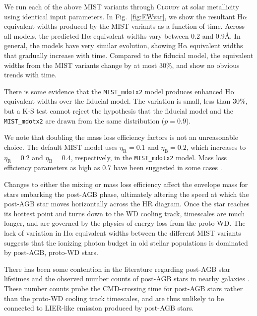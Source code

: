 \documentclass[preprint2]{aastex62}
\newcommand{\Cloudy}{\textsc{Cloudy}\xspace}
\newcommand{\ha}{\ensuremath{\mathrm{H\alpha}}\xspace}
\newcommand{\ang}{\ensuremath{\mbox{\AA}}\xspace}
\begin{document}
We run each of the above MIST variants through \Cloudy at solar metallicity using identical input parameters. In Fig.~\ref{fig:EWvar}, we show the resultant \ha equivalent widths produced by the MIST variants as a function of time. Across all models, the predicted \ha equivalent widths vary between 0.2 and 0.9\ang. In general, the models have very similar evolution, showing \ha equivalent widths that gradually increase with time. Compared to the fiducial model, the equivalent widths from the MIST variants change by at most 30\%, and show no obvious trends with time.

There is some evidence that the {\tt MIST\_mdotx2} model produces enhanced \ha equivalent widths over the fiducial model. The variation is small, less than 30\%, but a K-S test cannot reject the hypothesis that the fiducial model and the {\tt MIST\_mdotx2} are drawn from the same distribution ($p=0.9$).

We note that doubling the mass loss efficiency factors is not an unreasonable choice. The default MIST model uses $\eta_{\mathrm{R}} = 0.1$ and $\eta_{\mathrm{B}} = 0.2$, which increases to $\eta_{\mathrm{R}} = 0.2$ and $\eta_{\mathrm{B}} = 0.4$, respectively, in the {\tt MIST\_mdotx2} model. Mass loss efficiency parameters as high as 0.7 have been suggested in some cases \citep{McDonald+2015}.

Changes to either the mixing or mass loss efficiency affect the envelope mass for stars embarking the post-AGB phase, ultimately altering the speed at which the post-AGB star moves horizontally across the HR diagram. Once the star reaches its hottest point and turns down to the WD cooling track, timescales are much longer, and are governed by the physics of energy loss from the proto-WD. The lack of variation in \ha equivalent widths between the different MIST variants suggests that the ionizing photon budget in old stellar populations is dominated by post-AGB, proto-WD stars. 

There has been some contention in the literature regarding post-AGB star lifetimes and the observed number counts of post-AGB stars in nearby galaxies \citep[e.g.,][]{Brown+2008, Rosenfield+2012}. These number counts probe the CMD-crossing time for post-AGB stars rather than the proto-WD cooling track timescales, and are thus unlikely to be connected to LIER-like emission produced by post-AGB stars.

\end{document}
